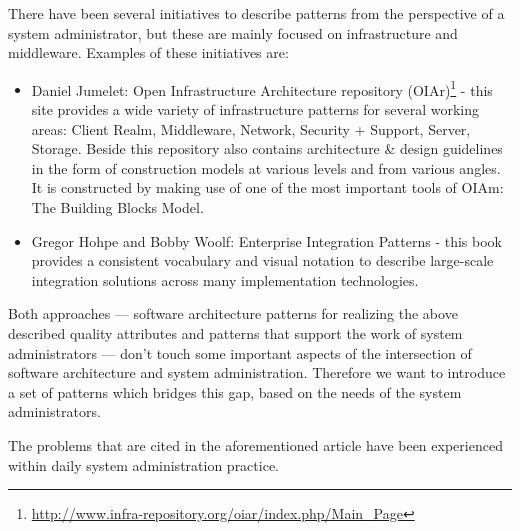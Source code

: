 There have been several initiatives to describe patterns from the perspective of a system administrator, but these are mainly focused on infrastructure and middleware. Examples of these initiatives are: 
\begin{itemize}
	\item Daniel Jumelet: Open Infrastructure Architecture repository (OIAr)\footnote{\url{http://www.infra-repository.org/oiar/index.php/Main_Page}} - this site provides a wide variety of infrastructure patterns for several working areas: Client Realm, Middleware, Network, Security + Support, Server, Storage. Beside this repository also contains architecture \& design guidelines in the form of construction models at various levels and from various angles. It is constructed by making use of one of the most important tools of OIAm: The Building Blocks Model. 
	\item Gregor Hohpe and Bobby Woolf: Enterprise Integration Patterns\cite{Hohpe2003} - this book provides a consistent vocabulary and visual notation to describe large-scale integration solutions across many implementation technologies. 
\end{itemize}

Both approaches --- software architecture patterns for realizing the above described quality attributes and patterns that support the work of system administrators --- don't touch some important aspects of the intersection of software architecture and system administration. Therefore we want to introduce a set of patterns which bridges this gap, based on the needs of the system administrators. 

The problems that are cited in the aforementioned article have been experienced within daily system administration practice. 



